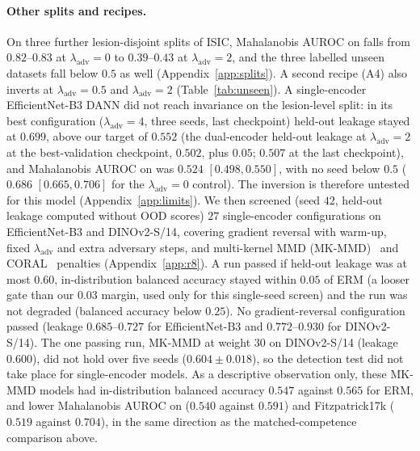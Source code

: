 \documentclass{midl}
\newcommand{\lam}{\lambda_{\mathrm{adv}}}
\begin{document}
\paragraph{Other splits and recipes.} On three further lesion-disjoint splits of ISIC,
Mahalanobis AUROC on \texttt{} falls from $0.82$--$0.83$ at $\lam=0$ to
$0.39$--$0.43$ at $\lam=2$, and the three labelled unseen datasets fall below $0.5$ as well
(Appendix~\ref{app:splits}). A second recipe (A4) also inverts at $\lam=0.5$ and $\lam=2$
(Table~\ref{tab:unseen}). A single-encoder EfficientNet-B3 DANN did not reach invariance on the
lesion-level split: in its best configuration ($\lam=4$, three seeds, last checkpoint) held-out leakage stayed at
$0.699$, above our target of $0.552$ (the dual-encoder held-out leakage at $\lam=2$ at the best-validation checkpoint, $0.502$, plus $0.05$; $0.507$ at the last checkpoint), and Mahalanobis AUROC on \texttt{} was $0.524$
$[0.498, 0.550]$, with no seed below $0.5$ ($0.686$ $[0.665, 0.706]$ for the $\lam=0$ control).
The inversion is therefore untested for this model (Appendix~\ref{app:limits}).
We then screened (seed $42$, held-out leakage computed without OOD scores)
$27$ single-encoder configurations on EfficientNet-B3 and DINOv2-S/14, covering gradient
reversal with warm-up, fixed $\lam$ and extra adversary steps, and multi-kernel MMD (MK-MMD)~\cite{long2015} and CORAL~\cite{sun2016coral} penalties
(Appendix~\ref{app:r8}). A run passed if held-out leakage was at most $0.60$, in-distribution
balanced accuracy stayed within $0.05$ of ERM (a looser gate than our $0.03$ margin, used only for this
single-seed screen) and the run was not degraded (balanced accuracy below $0.25$). No gradient-reversal configuration passed
(leakage $0.685$--$0.727$ for EfficientNet-B3 and $0.772$--$0.930$ for DINOv2-S/14). The one
passing run, MK-MMD at weight $30$ on DINOv2-S/14 (leakage $0.600$), did not hold over five
seeds ($0.604\pm0.018$), so the detection test did not take place for single-encoder models.
As a descriptive observation only, these MK-MMD models had in-distribution balanced accuracy
$0.547$ against $0.565$ for ERM, and lower Mahalanobis AUROC on \texttt{}
($0.540$ against $0.591$) and Fitzpatrick17k ($0.519$ against $0.704$), in the same direction
as the matched-competence comparison above.
\end{document}
